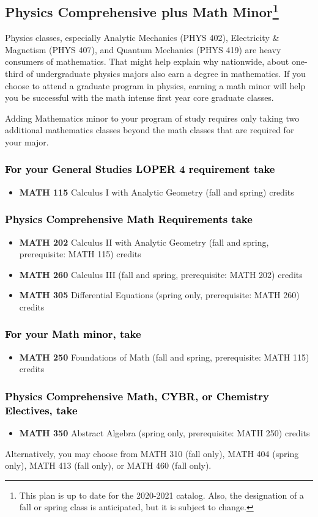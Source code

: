 \documentclass[10pt]{article}
\newenvironment{mypar}[2]
   {\begin{list}{}%
     {\setlength\leftmargin{#1}
     \setlength\rightmargin{#2}}
     \item[]}
   {\end{list}}
\newcommand{\calcone}{\textbf{MATH 115} Calculus I with Analytic Geometry (fall and spring) \dotfill 5 credits}
\newcommand{\calctwo}{\textbf{MATH 202} Calculus II with Analytic Geometry (fall and spring, prerequisite: MATH 115) \dotfill 5 credits }
\newcommand{\foundations}{\textbf{MATH 250} Foundations of Math (fall and spring, prerequisite: MATH 115)  \dotfill 3 credits}
\newcommand{\calcthree}{\textbf{MATH 260} Calculus III  (fall and spring, prerequisite: MATH 202) \dotfill 5 credits}
\newcommand{\diffeq}{\textbf{MATH 305}	Differential Equations (spring only, prerequisite: MATH 260) \dotfill 	3 credits}
\newcommand{\abstractalgebra}{\textbf{MATH 350}	Abstract Algebra (spring only, prerequisite: MATH 250) \dotfill 	3 credits}
\begin{document}
\subsection*{\textbf{\textcolor{unkblue}{Physics Comprehensive plus Math Minor\footnote[1]{This plan is up to date for the 2020-2021 catalog. Also, the designation of a fall or spring class is anticipated, but it is subject to change.
}}}}

\noindent Physics classes, especially  Analytic Mechanics (PHYS 402),
Electricity & Magnetism (PHYS 407), and Quantum Mechanics (PHYS 419)
are heavy consumers of mathematics. That might help explain why nationwide, about one-third of undergraduate physics majors also earn a degree in mathematics. If you choose to attend a graduate program in physics, earning a math minor will help you be successful with the math intense first year core graduate classes.

 Adding Mathematics minor to your program of study requires only taking two additional mathematics classes beyond the math classes that are required for your major.


\subsubsection*{\textcolor{black}{For your General Studies LOPER 4 requirement take}}
\begin{itemize}
\item \calcone
\end{itemize}


\subsubsection*{\textcolor{black}{Physics Comprehensive Math Requirements take}}
\begin{itemize}
 \item \calctwo
 \item \calcthree
 \item \diffeq
\end{itemize}

\subsubsection*{\textcolor{black}{For your Math minor, take}}
\begin{itemize}
\item \foundations
\end{itemize}

\subsubsection*{\textcolor{black}{Physics Comprehensive Math, CYBR, or Chemistry Electives, take}}
\begin{itemize}
\item \abstractalgebra
\end{itemize}
\begin{mypar}{0.5cm}{0.5cm} Alternatively, you may choose from MATH 310 (fall only), MATH 404 (spring only), MATH 413 (fall only), or MATH 460 (fall only).  \end{mypar}
\end{document}
